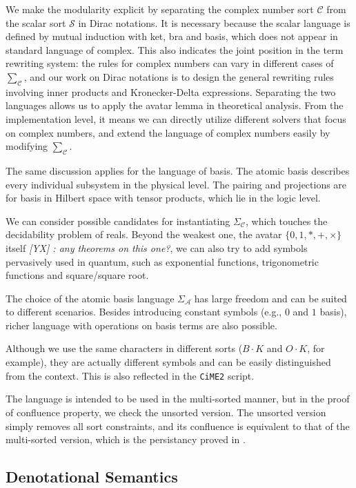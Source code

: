 \documentclass[manuscript, review, timestamp]{acmart}
\newcommand{\yx}[1]{\textit{\color{blue}[YX] : #1}}
\begin{document}
We make the modularity explicit by separating the complex number sort $\mathcal{C}$ from the scalar sort $\mathcal{S}$ in Dirac notations. It is necessary because the scalar language is defined by mutual induction with ket, bra and basis, which does not appear in standard language of complex. This also indicates the joint position in the term rewriting system: the rules for complex numbers can vary in different cases of $\sum_\mathcal{C}$, and our work on Dirac notations is to design the general rewriting rules involving inner products and Kronecker-Delta expressions. Separating the two languages allows us to apply the avatar lemma in theoretical analysis. From the implementation level, it means we can directly utilize different solvers that focus on complex numbers, and extend the language of complex numbers easily by modifying $\sum_\mathcal{C}$.

The same discussion applies for the language of basis. The atomic basis describes every individual subsystem in the physical level. The pairing and projections are for basis in Hilbert space with tensor products, which lie in the logic level.

We can consider possible candidates for instantiating $\Sigma_\mathcal{C}$, which touches the decidability problem of reals. Beyond the weakest one, the avatar $\{0, 1, *, +, \times\}$ itself \yx{any theorems on this one?}, we can also try to add symbols pervasively used in quantum, such as exponential functions, trigonometric functions and square/square root.

The choice of the atomic basis language $\Sigma_\mathcal{A}$ has large freedom and can be suited to different scenarios. Besides introducing constant symbols (e.g., $0$ and $1$ basis), richer language with operations on basis terms are also possible. 


Although we use the same characters in different sorts ($B \cdot K$ and $O \cdot K$, for example), they are actually different symbols and can be easily distinguished from the context. This is also reflected in the \texttt{CiME2} script. 

The language is intended to be used in the multi-sorted manner, but in the proof of confluence property, we check the unsorted version. The unsorted version simply removes all sort constraints, and its confluence is equivalent to that of the multi-sorted version, which is the persistancy proved in \cite{Aoto1997}.



\subsection{Denotational Semantics}
\end{document}
